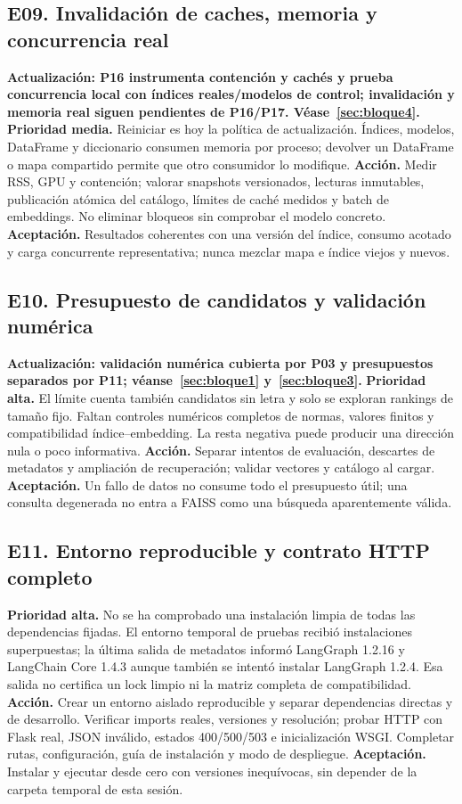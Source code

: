 \subsection{E09. Invalidación de caches, memoria y concurrencia real}
\textbf{Actualización: P16 instrumenta contención y cachés y prueba concurrencia
local con índices reales/modelos de control; invalidación y memoria real siguen
pendientes de P16/P17. Véase~\ref{sec:bloque4}.}
\textbf{Prioridad media.} Reiniciar es hoy la política de actualización. Índices,
modelos, DataFrame y diccionario consumen memoria por proceso; devolver un
DataFrame o mapa compartido permite que otro consumidor lo modifique.
\textbf{Acción.} Medir RSS, GPU y contención; valorar snapshots versionados,
lecturas inmutables, publicación atómica del catálogo, límites de caché medidos
y batch de embeddings. No eliminar bloqueos sin comprobar el modelo concreto.
\textbf{Aceptación.} Resultados coherentes con una versión del índice, consumo
acotado y carga concurrente representativa; nunca mezclar mapa e índice viejos
y nuevos.

\subsection{E10. Presupuesto de candidatos y validación numérica}
\textbf{Actualización: validación numérica cubierta por P03 y presupuestos
separados por P11; véanse~\ref{sec:bloque1} y~\ref{sec:bloque3}.}
\textbf{Prioridad alta.} El límite cuenta también candidatos sin letra y solo
se exploran rankings de tamaño fijo. Faltan controles numéricos completos de
normas, valores finitos y compatibilidad índice--embedding. La resta negativa
puede producir una dirección nula o poco informativa.
\textbf{Acción.} Separar intentos de evaluación, descartes de metadatos y
ampliación de recuperación; validar vectores y catálogo al cargar.
\textbf{Aceptación.} Un fallo de datos no consume todo el presupuesto útil;
una consulta degenerada no entra a FAISS como una búsqueda aparentemente válida.

\subsection{E11. Entorno reproducible y contrato HTTP completo}
\textbf{Prioridad alta.} No se ha comprobado una instalación limpia de todas las
dependencias fijadas. El entorno temporal de pruebas recibió instalaciones
superpuestas; la última salida de metadatos informó LangGraph 1.2.16 y
LangChain Core 1.4.3 aunque también se intentó instalar LangGraph 1.2.4. Esa
salida no certifica un lock limpio ni la matriz completa de compatibilidad.
\textbf{Acción.} Crear un entorno aislado reproducible y separar dependencias
directas y de desarrollo. Verificar imports reales, versiones y resolución;
probar HTTP con Flask real, JSON inválido, estados 400/500/503 e inicialización
WSGI. Completar rutas, configuración, guía de instalación y modo de despliegue.
\textbf{Aceptación.} Instalar y ejecutar desde cero con versiones inequívocas,
sin depender de la carpeta temporal de esta sesión.

